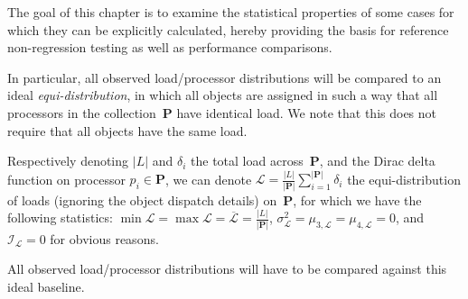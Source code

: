 The goal of this chapter is to examine the statistical properties of
some cases for which they can be explicitly calculated, hereby
providing the basis for reference non-regression testing as well as
performance comparisons.

In particular, all observed load/processor distributions will be
compared to an ideal \emph{equi-distribution}, in which all
objects are assigned in such a way that all processors in the
collection~$\mathbf{P}$ have identical load.
We note that this does not require that all objects have the same
load.

Respectively denoting $\vert{L}\vert$ and $\delta_i$ the total load
across~$\mathbf{P}$, and the Dirac delta function on processor
$p_i\in\mathbf{P}$, we can denote
$\mathcal{L}=\frac{\vert{L}\vert}{\vert{\mathbf{P}}\vert}
\sum_{i=1}^{\vert{\mathbf{P}}\vert}\delta_i$ the
equi-distribution of loads (ignoring the object dispatch details)
on~$\mathbf{P}$, for which we have  the following statistics:
$\min{\mathcal{L}} = \max{\mathcal{L}}
= \overline{\mathcal{L}} = \frac{\vert{L}\vert{}}{\vert{\mathbf{P}}\vert}$,
$\sigma_{\mathcal{L}}^2 = \mu_{3,\mathcal{L}} = \mu_{4,\mathcal{L}} = 0$,
and
$\mathcal{I}_{\mathcal{L}}= 0$
for obvious reasons.

All observed load/processor distributions will have to be compared
against this ideal baseline.

